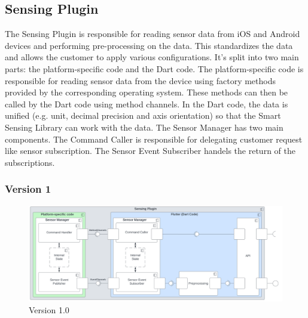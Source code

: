 \documentclass[12pt]{article}
\newcounter{fr}
\begin{document}
\subsection{Sensing Plugin}
The Sensing Plugin is responsible for reading sensor data from iOS and Android devices and performing pre-processing on the data. This standardizes the data and allows the customer to apply various configurations. It's split into two main parts: the platform-specific code and the Dart code. The platform-specific code is responsible for reading sensor data from the device using factory methods provided by the corresponding operating system. These methods can then be called by the Dart code using method channels. In the Dart code, the data is unified (e.g. unit, decimal precision and axis orientation) so that the Smart Sensing Library can work with the data. The Sensor Manager has two main components. The Command Caller is responsible for delegating customer request like sensor subscription. The Sensor Event Subscriber handels the return of the subscriptions.
\subsubsection{Version 1}
\begin{figure}[ht]
\includegraphics[width=1\textwidth]{Graphics/SmartSensingPluginOld.png}
\caption{\label{fig:bild3} Version 1.0}
\end{figure}
\end{document}
